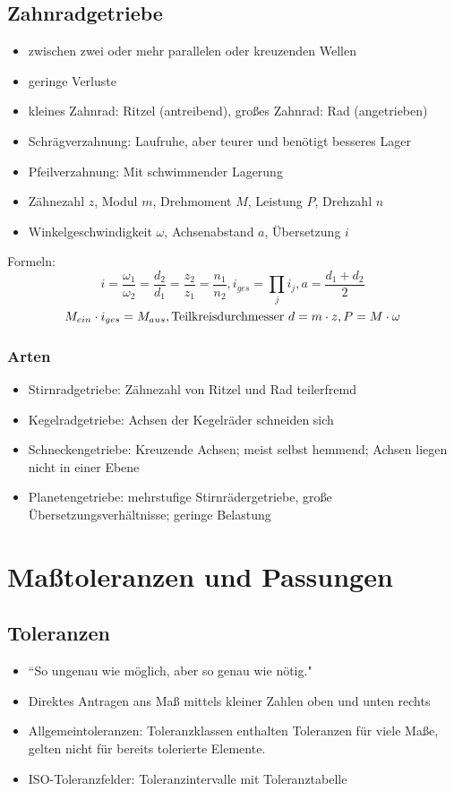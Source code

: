\documentclass[a4paper,DIV=15,fontsize=11pt]{scrartcl}
\begin{document}
\subsection{Zahnradgetriebe}
\begin{itemize}
	\item zwischen zwei oder mehr parallelen oder kreuzenden Wellen
	\item geringe Verluste
	\item kleines Zahnrad: Ritzel (antreibend), großes Zahnrad: Rad (angetrieben)
	\item Schrägverzahnung: Laufruhe, aber teurer und benötigt besseres Lager
	\item Pfeilverzahnung: Mit schwimmender Lagerung
	\item Zähnezahl $z$, Modul $m$, Drehmoment $M$, Leistung $P$, Drehzahl $n$
	\item Winkelgeschwindigkeit $\omega$, Achsenabstand $a$, Übersetzung $i$
\end{itemize}
Formeln: $$i=\frac{\omega_1}{\omega_2}=\frac{d_2}{d_1}=\frac{z_2}{z_1}=\frac{n_1}{n_2}, i_{ges}=\prod_{j}{} i_j,a=\frac{d_1+d_2}{2}$$
$$M_{ein} \cdot i_{ges}=M_{aus}, \textnormal{Teilkreisdurchmesser } d= m \cdot z, P=M \cdot \omega$$

	
\subsubsection{Arten}
\begin{itemize}
	\item Stirnradgetriebe: Zähnezahl von Ritzel und Rad teilerfremd
	\item Kegelradgetriebe: Achsen der Kegelräder schneiden sich
	\item Schneckengetriebe: Kreuzende Achsen; meist selbst hemmend; Achsen liegen nicht in einer Ebene
	\item Planetengetriebe: mehrstufige Stirnrädergetriebe, große Übersetzungsverhältnisse; geringe Belastung
\end{itemize}	
	
\section{Maßtoleranzen und Passungen}
\subsection{Toleranzen}
\begin{itemize}
	\item ``So ungenau wie möglich, aber so genau wie nötig."
	\item Direktes Antragen ans Maß mittels kleiner Zahlen oben und unten rechts
	\item Allgemeintoleranzen: Toleranzklassen enthalten Toleranzen für viele Maße, gelten nicht für bereits tolerierte Elemente.
	\item ISO-Toleranzfelder: Toleranzintervalle mit Toleranztabelle
\end{itemize}
\end{document}
